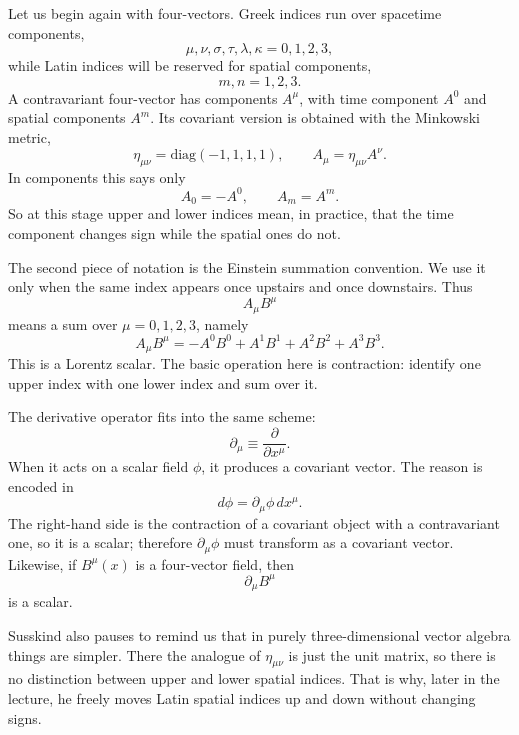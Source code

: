 Let us begin again with four-vectors. Greek indices run over spacetime components,
\[
\mu,\nu,\sigma,\tau,\lambda,\kappa = 0,1,2,3,
\]
while Latin indices will be reserved for spatial components,
\[
m,n = 1,2,3.
\]
A contravariant four-vector has components $A^\mu$, with time component $A^0$ and spatial components $A^m$. Its covariant version is obtained with the Minkowski metric,
\begin{equation}
\eta_{\mu\nu}=\mathrm{diag}(-1,1,1,1),
\qquad
A_\mu=\eta_{\mu\nu}A^\nu.
\end{equation}
In components this says only
\begin{equation}
A_0=-A^0,
\qquad
A_m=A^m.
\end{equation}
So at this stage upper and lower indices mean, in practice, that the time component changes sign while the spatial ones do not.

The second piece of notation is the Einstein summation convention. We use it only when the same index appears once upstairs and once downstairs. Thus
\begin{equation}
A_\mu B^\mu
\end{equation}
means a sum over $\mu=0,1,2,3$, namely
\begin{equation}
A_\mu B^\mu=-A^0B^0+A^1B^1+A^2B^2+A^3B^3.
\end{equation}
This is a Lorentz scalar. The basic operation here is contraction: identify one upper index with one lower index and sum over it.

The derivative operator fits into the same scheme:
\begin{equation}
\partial_\mu \equiv \frac{\partial}{\partial x^\mu}.
\end{equation}
When it acts on a scalar field $\phi$, it produces a covariant vector. The reason is encoded in
\begin{equation}
d\phi=\partial_\mu \phi\,dx^\mu.
\end{equation}
The right-hand side is the contraction of a covariant object with a contravariant one, so it is a scalar; therefore $\partial_\mu\phi$ must transform as a covariant vector. Likewise, if $B^\mu(x)$ is a four-vector field, then
\begin{equation}
\partial_\mu B^\mu
\end{equation}
is a scalar.

Susskind also pauses to remind us that in purely three-dimensional vector algebra things are simpler. There the analogue of $\eta_{\mu\nu}$ is just the unit matrix, so there is no distinction between upper and lower spatial indices. That is why, later in the lecture, he freely moves Latin spatial indices up and down without changing signs.

